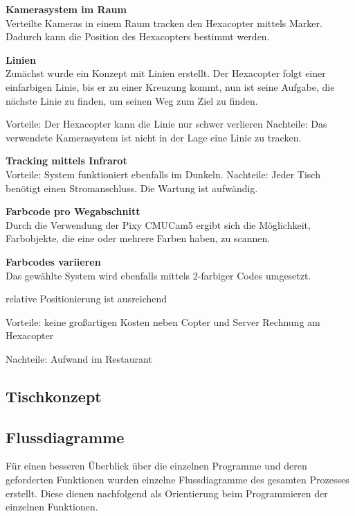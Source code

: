 \begin{itemize}
      \textbf{Kamerasystem im Raum}\\
      Verteilte Kameras in einem Raum tracken den Hexacopter mittels Marker. Dadurch kann die Position des Hexacopters bestimmt werden.


      \textbf{Linien}\\
      Zunächst wurde ein Konzept mit Linien erstellt. Der Hexacopter folgt einer einfarbigen Linie, bis er zu einer Kreuzung kommt, nun ist seine Aufgabe, die nächste Linie zu finden, um seinen Weg zum Ziel zu finden.

      Vorteile: Der Hexacopter kann die Linie nur schwer verlieren
      Nachteile: Das verwendete Kamerasystem ist nicht in der Lage eine Linie zu tracken.

      \textbf{Tracking mittels Infrarot}\\


      Vorteile:
      System funktioniert ebenfalls im Dunkeln.
      Nachteile:
      Jeder Tisch benötigt einen Stromanschluss.
      Die Wartung ist aufwändig.

      \textbf{Farbcode pro Wegabschnitt}\\
      Durch die Verwendung der Pixy CMUCam5 ergibt sich die Möglichkeit, Farbobjekte, die eine oder mehrere Farben haben, zu scannen.



      \textbf{Farbcodes variieren}\\
      Das gewählte System wird ebenfalls mittels 2-farbiger Codes umgesetzt.


      relative Positionierung ist ausreichend

      Vorteile:
      keine großartigen Kosten neben Copter und Server
      Rechnung am Hexacopter

      Nachteile:
      Aufwand im Restaurant



  \subsection{Tischkonzept}



  \subsection{Flussdiagramme}
  Für einen besseren Überblick über die einzelnen Programme und deren geforderten Funktionen wurden einzelne Flussdiagramme des gesamten Prozesses erstellt.
  Diese dienen nachfolgend als Orientierung beim Programmieren der einzelnen Funktionen.


\end{itemize}
